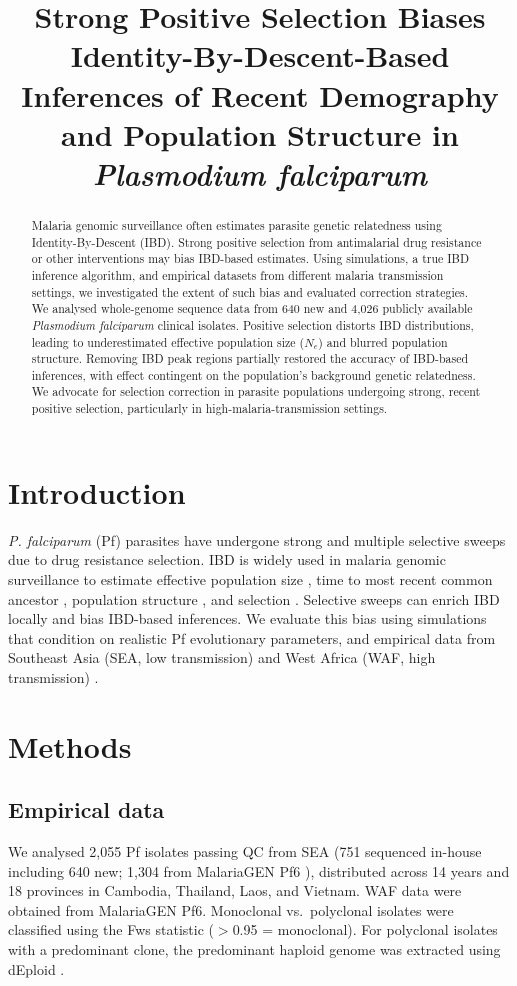 \documentclass[11pt]{article}
\title{Strong Positive Selection Biases Identity-By-Descent-Based Inferences of Recent Demography and Population Structure in \textit{Plasmodium falciparum}}
\author{}
\date{}
\begin{document}
\maketitle

\begin{abstract}
Malaria genomic surveillance often estimates parasite genetic relatedness using Identity-By-Descent (IBD). Strong positive selection from antimalarial drug resistance or other interventions may bias IBD-based estimates. Using simulations, a true IBD inference algorithm, and empirical datasets from different malaria transmission settings, we investigated the extent of such bias and evaluated correction strategies. We analysed whole-genome sequence data from 640 new and 4{,}026 publicly available \textit{Plasmodium falciparum} clinical isolates. Positive selection distorts IBD distributions, leading to underestimated effective population size ($N_e$) and blurred population structure. Removing IBD peak regions partially restored the accuracy of IBD-based inferences, with effect contingent on the population's background genetic relatedness. We advocate for selection correction in parasite populations undergoing strong, recent positive selection, particularly in high-malaria-transmission settings.
\end{abstract}

\section{Introduction}
\textit{P. falciparum} (Pf) parasites have undergone strong and multiple selective sweeps due to drug resistance selection. IBD is widely used in malaria genomic surveillance to estimate effective population size \citep{r12}, time to most recent common ancestor \citep{r22,r24}, population structure \citep{r14,r16,r17,r54}, and selection \citep{r9,r37,r41}. Selective sweeps can enrich IBD locally \citep{r9,r37,r40,r41} and bias IBD-based inferences. We evaluate this bias using simulations that condition on realistic Pf evolutionary parameters, and empirical data from Southeast Asia (SEA, low transmission) and West Africa (WAF, high transmission) \citep{r1,r9}.

\section{Methods}
\subsection{Empirical data}
We analysed 2{,}055 Pf isolates passing QC from SEA (751 sequenced in-house including 640 new; 1{,}304 from MalariaGEN Pf6 \citep{r48}), distributed across 14 years and 18 provinces in Cambodia, Thailand, Laos, and Vietnam. WAF data were obtained from MalariaGEN Pf6. Monoclonal vs.\ polyclonal isolates were classified using the Fws statistic ($>$0.95 = monoclonal). For polyclonal isolates with a predominant clone, the predominant haploid genome was extracted using dEploid \citep{r49,r50}.
\end{document}
